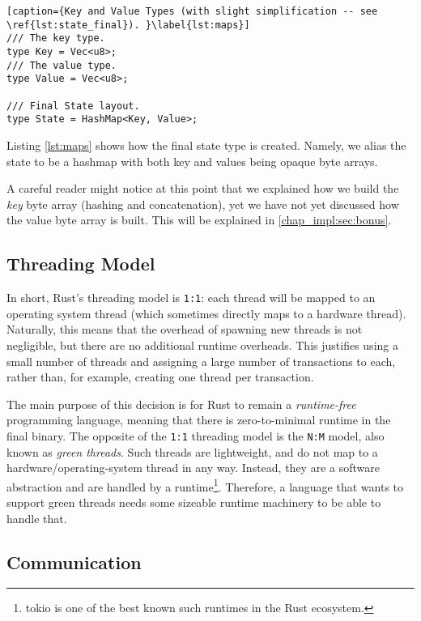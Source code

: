 \begin{lstlisting}[caption={Key and Value Types (with slight simplification -- see \ref{lst:state_final}). }\label{lst:maps}]
/// The key type.
type Key = Vec<u8>;
/// The value type.
type Value = Vec<u8>;

/// Final State layout.
type State = HashMap<Key, Value>;
\end{lstlisting}

Listing \ref{lst:maps} shows how the final state type is created. Namely, we alias the state to be a
hashmap with both key and values being opaque byte arrays.

\begin{remark}
    A careful reader might notice at this point that we explained how we build the \textit{key} byte array (hashing and concatenation), yet we have not yet discussed how the value byte array is built. This will be explained in \ref{chap_impl:sec:bonus}.
\end{remark}

\subsection{Threading Model}

In short, Rust's threading model is \texttt{1:1}: each thread will be mapped to an operating system
thread (which sometimes directly maps to a hardware thread). Naturally, this means that the overhead
of spawning new threads is not negligible, but there are no additional runtime overheads. This
justifies using a small number of threads and assigning a large number of transactions to each,
rather than, for example, creating one thread per transaction.

The main purpose of this decision is for Rust to remain a \textit{runtime-free} programming
language\cite{RustJourneyAsync}, meaning that there is zero-to-minimal runtime in the final binary.
The opposite of the \texttt{1:1} threading model is the \texttt{N:M} model, also known as
\textit{green threads}. Such threads are lightweight, and do not map to a hardware/operating-system
thread in any way. Instead, they are a software abstraction and are handled by a
runtime\footnote{tokio is one of the best known such runtimes in the Rust
ecosystem\cite{TokioRust}.}. Therefore, a language that wants to support green threads needs some
sizeable runtime machinery to be able to handle that.

\subsection{Communication}

